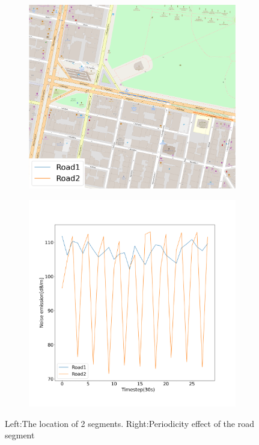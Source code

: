\documentclass{article}
\begin{document}
\begin{figure}[h]
     \centering
     \begin{subfigure}[H]{0.45\textwidth}
         \centering
         \includegraphics[width=\textwidth]{road.png}
         
         \label{r1}
     \end{subfigure}
     \hfill
     \begin{subfigure}[H]{0.52\textwidth}
         \centering
         \includegraphics[width=\textwidth]{t vs noise.png}
         
         \label{r2}
     \end{subfigure}
\caption{Left:The location of 2 segments. Right:Periodicity effect of the road segment}
\label{Periodicity}
\end{figure}
\end{document}
